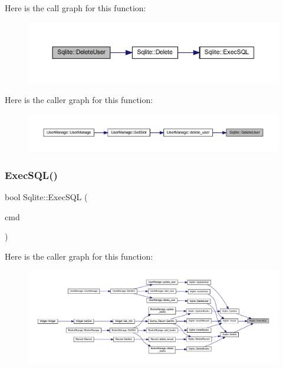 Here is the call graph for this function\+:
\nopagebreak
\begin{figure}[H]
\begin{center}
\leavevmode
\includegraphics[width=350pt]{class_sqlite_af2b581d800d01e1f1281d98ec1341ddd_cgraph}
\end{center}
\end{figure}
Here is the caller graph for this function\+:
\nopagebreak
\begin{figure}[H]
\begin{center}
\leavevmode
\includegraphics[width=350pt]{class_sqlite_af2b581d800d01e1f1281d98ec1341ddd_icgraph}
\end{center}
\end{figure}
\mbox{\label{class_sqlite_a3d4be952cdb19b674a80dacd78e2873a}} 
\subsubsection{\texorpdfstring{ExecSQL()}{ExecSQL()}}
{\footnotesize\ttfamily bool Sqlite\+::\+Exec\+S\+QL (\begin{DoxyParamCaption}\item[{Q\+String}]{cmd }\end{DoxyParamCaption})}

Here is the caller graph for this function\+:
\nopagebreak
\begin{figure}[H]
\begin{center}
\leavevmode
\includegraphics[width=350pt]{class_sqlite_a3d4be952cdb19b674a80dacd78e2873a_icgraph}
\end{center}
\end{figure}
\mbox{\label{class_sqlite_a8d0c32df6db2b0ca13695cfa8780840e}} 
